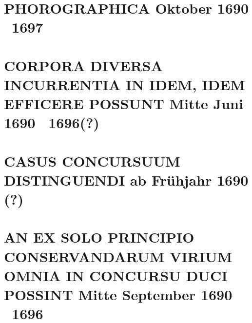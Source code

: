 \documentclass[%
fontsize=10pt,
]{scrbook}
\DeclareRobustCommand{\bracks}[1]{%
\textup{\lbrack}#1\textup{\rbrack}}
\begin{document}
\chapter[tocentry={Phorographica
\enskip \bracks{Oktober 1690 \textendash\ 1697}},
head={Phorographica}]%
{\MakeUppercase{Phorographica}
\newline \bracks{Oktober 1690 \textendash\ 1697}}

\label{60356}







\chapter[tocentry={Corpora diversa incurrentia in idem, idem efficere possunt
\enskip\bracks{%
Mitte Juni 1690 \textendash\ 1696\;(?)%
}},
head={Corpora diversa incurrentia idem efficere possunt}]%
{\MakeUppercase{Corpora diversa incurrentia in idem, idem efficere possunt}
\newline\bracks{%
Mitte Juni 1690 \textendash\ 1696\;(?)}%
}
\label{41121}




\chapter[tocentry={Casus concursuum distinguendi
\enskip\bracks{%
ab Frühjahr 1690 (?)%
}}, %
head={Casus concursuum distinguendi}]%
{\MakeUppercase{Casus concursuum distinguendi}
\newline\bracks{%
ab Frühjahr 1690 (?)%
}}%
\label{58946}




\chapter[tocentry={An ex solo principio conservandarum virium omnia in concursu duci possint 
\enskip \bracks{Mitte September 1690 \textendash\ 1696}},
head={An ex solo principio conservandarum virium omnia duci possint }]%
{\MakeUppercase{An ex solo principio conservandarum virium omnia in concursu duci possint}
\newline \bracks{Mitte September 1690 \textendash\ 1696}}
\label{41780}
	
\end{document}
